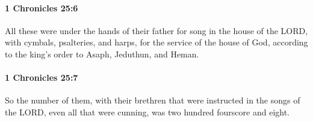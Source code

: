 		\paragraph{1 Chronicles 25:6} %
			\label{1CHRONICLES-25-6}

			All these were under the hands of their father for song in the house of the LORD, with cymbals, psalteries, and harps, for the service of the house of God, according to the king’s order to Asaph, Jeduthun, and Heman.


		\paragraph{1 Chronicles 25:7} %
			\label{1CHRONICLES-25-7}

			So the number of them, with their brethren that were instructed in the songs of the LORD, even all that were cunning, was two hundred fourscore and eight.


